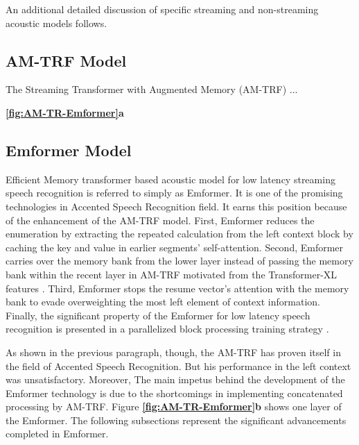  
 An additional detailed discussion of specific streaming and non-streaming acoustic models follows.




\subsection{AM-TRF Model}
The Streaming Transformer with Augmented Memory (AM-TRF) \cite{wu2020streaming} ...

\textbf{\ref{fig:AM-TR-Emformer}a}

 



\subsection{Emformer Model }
Efficient Memory transformer based acoustic model for low latency streaming speech recognition is referred to simply as Emformer. It is one of the promising technologies in Accented Speech Recognition field. It earns this position because of the enhancement of the AM-TRF model. First, Emformer reduces the enumeration by extracting the repeated calculation from the left context block by caching the key and value in earlier segments' self-attention. Second, Emformer carries over the memory bank from the lower layer instead of passing the memory bank within the recent layer in AM-TRF motivated from the Transformer-XL features \cite{dai2019transformer, lu2020exploring}. Third, Emformer stops the resume vector's attention with the memory bank to evade overweighting the most left element of context information. Finally, the significant property of the Emformer for low latency speech recognition is presented in a parallelized block processing training strategy \cite{shi2021emformer}.


As shown in the previous paragraph, though, the AM-TRF has proven itself in the field of Accented Speech Recognition\cite{wu2020streaming}. But his performance in the left context was unsatisfactory. Moreover, The main impetus behind the development of the Emformer technology is due to the shortcomings in implementing concatenated processing by AM-TRF.  Figure \textbf{\ref{fig:AM-TR-Emformer}b} shows one layer of the Emformer. The following subsections represent the significant advancements completed in Emformer.

